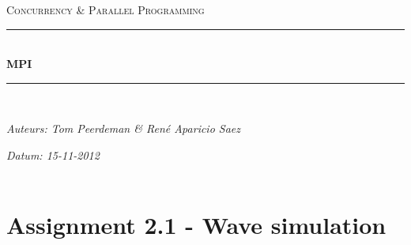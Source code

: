 \documentclass[a4paper]{article}
\newcommand{\HRule}{\rule{\linewidth}{0.5mm}}
\begin{document}
	\begin{titlepage}
	\begin{center}
		\textsc{\Large Concurrency \& Parallel Programming}\\[0.5cm]
		\HRule \\[0,4cm]
		\textsc{\huge \bfseries MPI}
		\HRule \\[8cm]
		\begin{minipage}{0.4\textwidth}
			\begin{flushleft}\large
				\emph{Auteurs: Tom Peerdeman \& Ren\'e Aparicio Saez}\\
			\end{flushleft}
		\end{minipage}
		\begin{minipage}{0.4\textwidth}
			\begin{flushright}\large
			\emph{Datum: 15-11-2012\\\hspace{1cm}}\\
			\end{flushright}
		\end{minipage}
	\end{center}
	\end{titlepage}

  \section{Assignment 2.1 - Wave simulation}
\end{document}
